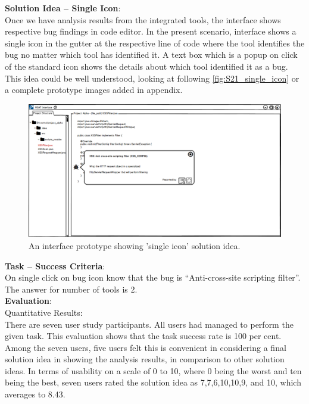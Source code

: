 \textbf{Solution Idea – Single Icon}: \\

Once we have analysis results from the integrated tools, the interface shows respective bug findings in code editor. In the present scenario, interface shows a single icon in the gutter at the respective line of code where the tool identifies the bug no matter which tool has identified it. A text box which is a popup on click of the standard icon shows the details about which tool identified it as a bug. This idea could be well understood, looking at following \autoref{fig:S21_single_icon} or a complete prototype images added in appendix. \\

\begin{figure}[hbt!]
	\centering
	\includegraphics[width=\linewidth]{figures/solution_ideas_snaps/S21_single_icon}
	\caption{An interface prototype showing 'single icon' solution idea.}
	\label{fig:S21_single_icon}
\end{figure}

\textbf{Task – Success Criteria}: \\

On single click on bug icon know that the bug is “Anti-cross-site scripting filter”. The answer for number of tools is 2. \\

\textbf{Evaluation}: \\

Quantitative Results: \\

There are seven user study participants. All users had managed to perform the given task. This evaluation shows that the task success rate is 100 per cent. \\

Among the seven users, five users felt this is convenient in considering a final solution idea in showing the analysis results, in comparison to other solution ideas. In terms of usability on a scale of 0 to 10, where 0 being the worst and ten being the best, seven users rated the solution idea as 7,7,6,10,10,9, and 10, which averages to 8.43. \\

